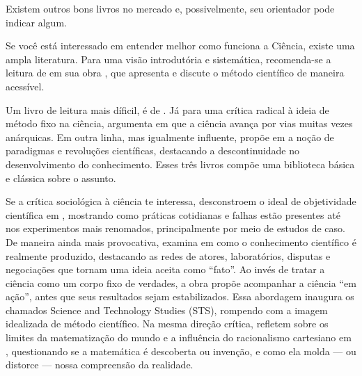 Existem outros bons livros no mercado e, possivelmente, seu orientador pode indicar algum.

Se você está interessado em entender melhor como funciona a Ciência, existe uma ampla literatura. 
Para uma visão introdutória e sistemática, recomenda-se a leitura de \citet{chalmers1999o} em sua obra , que apresenta e discute o método científico de maneira acessível. 

Um livro  de leitura mais díficil, é  de \citet{Popper1972}. 
Já para uma crítica radical à ideia de método fixo na ciência, \citet{feyerabend1975contra} argumenta em  que a ciência avança por vias muitas vezes anárquicas. 
Em outra linha, mas igualmente influente, \citet{kuhn1962estrutura} propõe em  a noção de paradigmas e revoluções científicas, destacando a descontinuidade no desenvolvimento do conhecimento. Esses três livros compõe uma biblioteca básica e clássica sobre o assunto.

Se a crítica sociológica à ciência te interessa, \citet{collins1993golem} desconstroem o ideal de objetividade científica em , mostrando como práticas cotidianas e falhas estão presentes até nos experimentos mais renomados, principalmente por meio de estudos de caso. 
De maneira ainda mais provocativa, \citet{latour1987science} examina em  como o conhecimento científico é realmente produzido, destacando as redes de atores, laboratórios, disputas e negociações que tornam uma ideia aceita como ``fato''. Ao invés de tratar a ciência como um corpo fixo de verdades, a obra propõe acompanhar a ciência ``em ação'', antes que seus resultados sejam estabilizados. Essa abordagem inaugura os chamados Science and Technology Studies (STS), rompendo com a imagem idealizada de método científico. 
Na mesma direção crítica, \citet{davis1990sonho} refletem sobre os limites da matematização do mundo e a influência do racionalismo cartesiano em , questionando se a matemática é descoberta ou invenção, e como ela molda — ou distorce — nossa compreensão da realidade.
